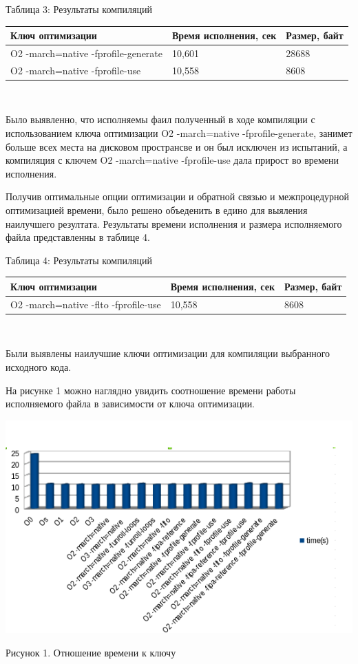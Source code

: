 \documentclass[12pt,a4paper]{scrartcl}
\begin{document}
\begin{center}
\caption{Таблица 3: Результаты компиляций}
\begin{tabular}{| l | l | l |}
\hline
Ключ оптимизации & Время исполнения, сек & Размер, байт  \\ \hline
O2 -march=native -fprofile-generate& 10,601	&28688\\
O2 -march=native -fprofile-use&	10,558	&8608\\
\hline
\end{tabular}\\
\end{center}
Было выявленно, что исполняемы фаил полученный в ходе компиляции с использованием ключа оптимизации
O2 -march=native -fprofile-generate, занимет больше всех места на дисковом пространсве и он был исключен
из испытаний, а компиляция с ключем O2 -march=native -fprofile-use дала прирост во времени исполнения.
\par
Получив оптимальные опции оптимизации и обратной связью и межпроцедурной оптимизацией времени, 
было решено объеденить в едино для выяления наилучшего резултата.
 Результаты времени исполнения и размера исполняемого файла представленны в таблице 4.
\begin{center}
\caption{Таблица 4: Результаты компиляций}
\begin{tabular}{| l | l | l |}
\hline
Ключ оптимизации & Время исполнения, сек & Размер, байт  \\ \hline
O2 -march=native -flto -fprofile-use&	10,558	&8608\\
\hline
\end{tabular}\\
\end{center}
Были выявлены наилучшие ключи оптимизации для компиляции выбранного исходного кода.
\par
На рисунке 1 можно наглядно увидить соотношение времени работы исполняемого файла в зависимости от 
ключа оптимизации.
\begin{center}
\includegraphics[width=\linewidth]{time.PNG}
\caption{Рисунок 1. Отношение времени к ключу}
\end{center}
\end{document}
